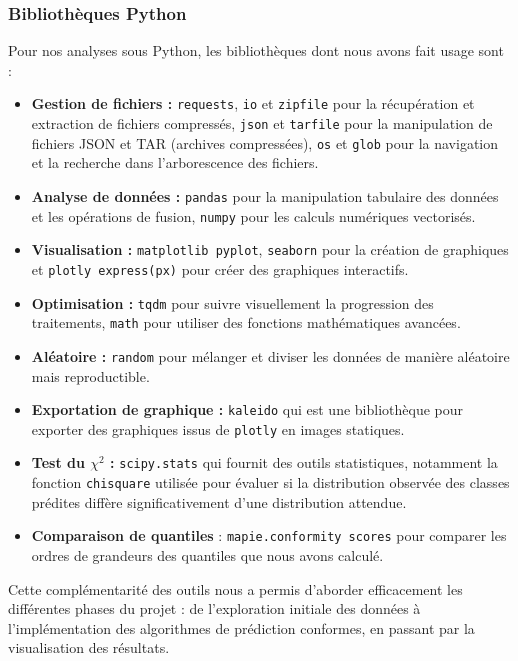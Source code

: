 \documentclass[a4paper,12pt]{article}
\begin{document}
\subsubsection{Bibliothèques Python}

Pour nos analyses sous Python, les bibliothèques dont nous avons fait usage sont :
\begin{itemize}
    \item \textbf{Gestion de fichiers :} \texttt{requests}, \texttt{io}  et \texttt{zipfile} pour la récupération et extraction de fichiers compressés, \texttt{json} et \texttt{tarfile} pour la manipulation de fichiers JSON et TAR (archives compressées), \texttt{os} et \texttt{glob} pour la navigation et la recherche dans l'arborescence des fichiers.
    \item \textbf{Analyse de données :} \texttt{pandas} pour la manipulation tabulaire des données et les opérations de fusion, \texttt{numpy} pour les calculs numériques vectorisés.
    \item \textbf{Visualisation :} \texttt{matplotlib pyplot}, \texttt{seaborn} pour la création de graphiques et \texttt{plotly express(px)} pour créer des graphiques interactifs.
    \item \textbf{Optimisation :} \texttt{tqdm} pour suivre visuellement la progression des traitements, \texttt{math} pour utiliser des fonctions mathématiques avancées.
    \item \textbf{Aléatoire :} \texttt{random} pour mélanger et diviser les données de manière aléatoire mais reproductible.
    \item \textbf{Exportation de graphique :} \texttt{kaleido} qui est une bibliothèque pour exporter des graphiques issus de \texttt{plotly} en images statiques.
    \item \textbf{Test du $\chi^2$ :} \texttt{scipy.stats} qui fournit des outils statistiques, notamment la fonction \texttt{chisquare} utilisée pour évaluer si la distribution observée des classes prédites diffère significativement d'une distribution attendue.
    \item \textbf{Comparaison de quantiles} : \texttt{mapie.conformity scores} pour comparer les ordres de grandeurs des quantiles que nous avons calculé.
\end{itemize}

\vspace{0.2cm}

Cette complémentarité des outils nous a permis d'aborder efficacement les différentes phases du projet : de l'exploration initiale des données à l'implémentation des algorithmes de prédiction conformes, en passant par la visualisation des résultats.
\end{document}
